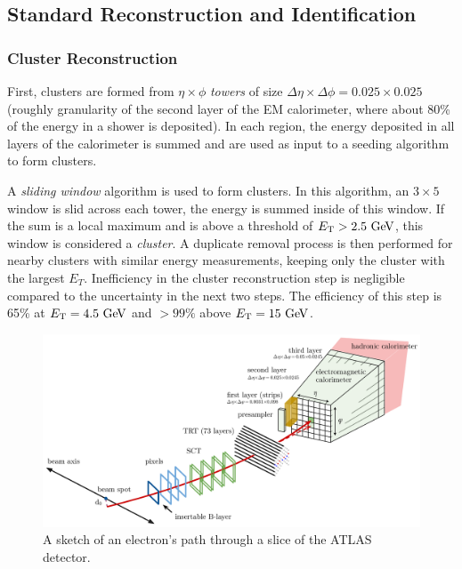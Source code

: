 \subsection{Standard Reconstruction and Identification}


\subsubsection{Cluster Reconstruction}

First, clusters are formed from $\eta \times \phi$ \emph{towers} of size $\Delta \eta \times \Delta \phi = 0.025 \times 0.025$ (roughly granularity of the second layer of the \ac{EM} calorimeter, where about 80\% of the energy in a shower is deposited). In each region, the energy deposited in all layers of the calorimeter is summed and are used as input to a seeding algorithm to form clusters. 

A \emph{sliding window} algorithm \cite{electron-sliding-window} is used to form clusters. In this algorithm, an $3 \times 5$ window is slid across each tower, the energy is summed inside of this window. If the sum is a local maximum and is above a threshold of $\et > 2.5 \GeV$, this window is considered a \emph{cluster}. A duplicate removal process is then performed for nearby clusters with similar energy measurements, keeping only the cluster with the largest $E_{T}$. Inefficiency in the cluster reconstruction step is negligible compared to the uncertainty in the next two steps. The efficiency of this step is 65\% at $\et = 4.5 \GeV$ and $> 99\%$ above $\et = 15 \GeV$.

\begin{figure}[htbp]
\centering
\includegraphics[width=.8\textwidth]{figures/EventReconstruction/electron-reco-sketch.png}
\caption{A sketch of an electron's path through a slice of the \ac{ATLAS} detector.}
\label{fig:elec_reco_sketch}
\end{figure}

